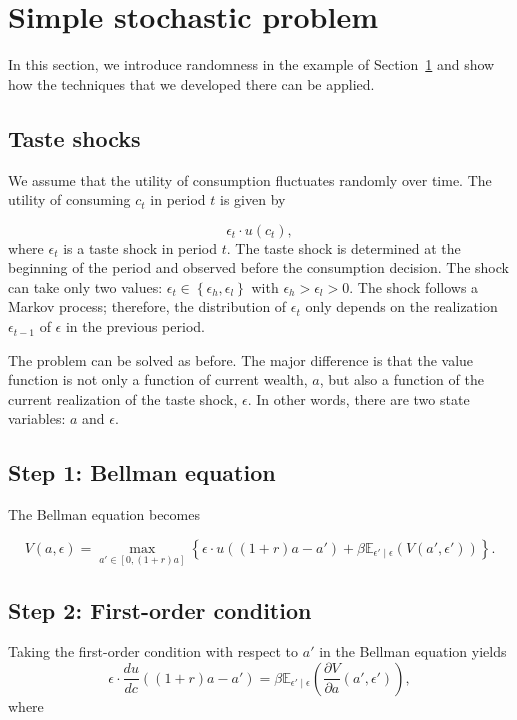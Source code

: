 \documentclass{article}
\begin{document}
\setcounter{section}{1}
\section{Simple stochastic problem}\label{sec:stochastic}\wcSpan*[id=ref-sec-stochastic]{}

In this section, we introduce randomness in the example of Section~\href{deterministic.tex#ref-sec-deterministic}{1} and show how the techniques that we developed there can be applied.

\subsection{Taste shocks}

We assume that the utility of consumption fluctuates randomly over time. The utility of consuming $c_{t}$ in period $t$ is given by

\[
\epsilon_t \cdot u(c_t),
\]
where $\epsilon_t$ is a taste shock in period $t$. The taste shock is determined at the beginning of the period and observed before the consumption decision. The shock can take only two values: $\epsilon_{t}\in\left\lbrace \epsilon_h,\epsilon_l\right\rbrace $ with $\epsilon_h>\epsilon_l>0$. The shock follows a Markov process; therefore, the distribution of $\epsilon_t$ only depends on the realization $\epsilon_{t-1}$ of $\epsilon$ in the previous period. 

The problem can be solved as before. The major difference is that the value function is not only a function of current wealth, $a$, but also a function of the current realization of the taste shock, $\epsilon$. In other words, there are two state variables: $a$ and $\epsilon$.

\subsection{Step 1: Bellman equation}

The Bellman equation becomes

\[
V(a,\epsilon)=\max_{a'\in[0,(1+r) a]} \left\lbrace \epsilon \cdot u((1+r) a-a')+\beta \mathbb{E}_{\epsilon'\mid \epsilon}\left(V(a',\epsilon')\right)\right\rbrace .
\]
\subsection{Step 2: First-order condition}
Taking the first-order condition with respect to $a'$ in the Bellman equation yields
\wcSpan*[id=equation-19]{}
\setcounter{tpequation}{18}\label{e:foc0}
\[
\epsilon \cdot \frac{d u}{d c}((1+r) a-a')=\beta \mathbb{E}_{\epsilon'\mid \epsilon}\left(\frac{\partial V}{\partial a}(a',\epsilon')\right),\tag{19}
\]
where 
\end{document}
